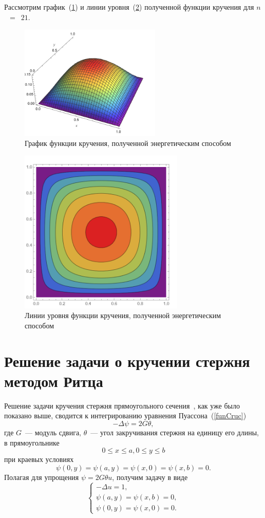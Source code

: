 \documentclass[12pt, a4paper]{article}
\begin{document}
Рассмотрим график~(\ref{ser_graph}) и линии уровня~(\ref{ser_levels}) полученной функции кручения для $n$~$=$~$21$.
\begin{figure}[!h]
	\centering
	\includegraphics[width=0.6\textwidth]{ser_graph}%
	\caption{График функции кручения, полученной энергетическим способом}
	\vspace*{-2mm}
	\label{ser_graph}
\end{figure}
\begin{figure}[!h]
	\centering
	\includegraphics[width=0.7\textwidth]{ser_levels}%
	\caption{Линии уровня функции кручения, полученной энергетическим способом}
	\vspace*{-2mm}
	\label{ser_levels}
\end{figure}
\newpage
\section{Решение задачи о кручении стержня методом Ритца}
Решение задачи кручения стержня прямоугольного сечения~\cite{Michilin}, как уже было показано выше,  сводится к интегрированию уравнения Пуассона~(\ref{funCruc})
 \[
-\Delta \psi = 2G \theta,
\]
где $G$~--- модуль сдвига, $\theta$~--- угол закручивания стержня на единицу
его длины, в прямоугольнике
\[
0 \leqslant x \leqslant a, 0 \leqslant y \leqslant b
\]
при краевых условиях
\[
\psi(0, y) = \psi(a, y) = \psi(x, 0) = \psi(x, b) = 0.
\]
Полагая для упрощения $\psi = 2G \theta u$, получим задачу в виде
\[
	\begin{cases}
	-\Delta u = 1, \\
	\psi(a, y) =  \psi(x,b) = 0, \\
	\psi(0, y) =  \psi(x,0) = 0.
	\end{cases}
\]
\end{document}
